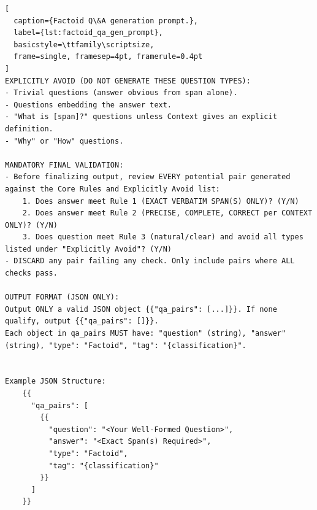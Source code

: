 \documentclass[pdflatex, sn-apa]{sn-jnl}%
\theoremstyle{thmstyleone}%
\theoremstyle{thmstyletwo}%
\theoremstyle{thmstylethree}%
\begin{document}
\begin{lstlisting}[
  caption={Factoid Q\&A generation prompt.},
  label={lst:factoid_qa_gen_prompt},
  basicstyle=\ttfamily\scriptsize,
  frame=single, framesep=4pt, framerule=0.4pt
]
EXPLICITLY AVOID (DO NOT GENERATE THESE QUESTION TYPES):
- Trivial questions (answer obvious from span alone).
- Questions embedding the answer text.
- "What is [span]?" questions unless Context gives an explicit definition.
- "Why" or "How" questions.

MANDATORY FINAL VALIDATION:
- Before finalizing output, review EVERY potential pair generated against the Core Rules and Explicitly Avoid list:
    1. Does answer meet Rule 1 (EXACT VERBATIM SPAN(S) ONLY)? (Y/N)
    2. Does answer meet Rule 2 (PRECISE, COMPLETE, CORRECT per CONTEXT ONLY)? (Y/N)
    3. Does question meet Rule 3 (natural/clear) and avoid all types listed under "Explicitly Avoid"? (Y/N)
- DISCARD any pair failing any check. Only include pairs where ALL checks pass.

OUTPUT FORMAT (JSON ONLY):
Output ONLY a valid JSON object {{"qa_pairs": [...]}}. If none qualify, output {{"qa_pairs": []}}.
Each object in qa_pairs MUST have: "question" (string), "answer" (string), "type": "Factoid", "tag": "{classification}".


Example JSON Structure:
    {{
      "qa_pairs": [
        {{
          "question": "<Your Well-Formed Question>",
          "answer": "<Exact Span(s) Required>",
          "type": "Factoid",
          "tag": "{classification}"
        }}
      ]
    }}
\end{lstlisting}
\end{document}
